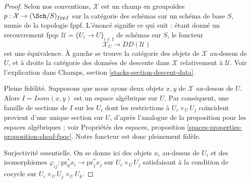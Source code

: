 \begin{proof}
Selon nos conventions, $\mathcal{X}$ est un champ
en groupoïdes $p : \mathcal{X} \to (\Sch/S)_{fppf}$
sur la catégorie des schémas sur un schéma de base $S$, munie
de la topologie fppf. L'énoncé signifie ce qui suit :
étant donné un recouvrement fpqc $\mathcal{U} = \{U_i \to U\}_{i \in I}$
de schémas sur $S$, le foncteur
$$
\mathcal{X}_U \longrightarrow DD(\mathcal{U})
$$
est une équivalence. À gauche se trouve la catégorie
des objets de $\mathcal{X}$ au-dessus de $U$, et à droite
la catégorie des données de descente dans $\mathcal{X}$ relativement à $\mathcal{U}$.
Voir l'explication dans Champs, section \ref{stacks-section-descent-data}.

\medskip\noindent
Pleine fidélité. Supposons que nous ayons deux objets $x, y$ de $\mathcal{X}$
au-dessus de $U$. Alors $I = \mathit{Isom}(x, y)$ est un espace algébrique sur $U$.
Par conséquent, une famille de sections de $I$ sur les $U_i$ dont les restrictions
à $U_i \times_U U_j$ coïncident provient d'une unique section sur $U$, d'après
l'analogue de la proposition pour les espaces algébriques ; voir
Propriétés des espaces, proposition
\ref{spaces-properties-proposition-sheaf-fpqc}.
Notre foncteur est donc pleinement fidèle.

\medskip\noindent
Surjectivité essentielle. On se donne ici des objets
$x_i$ au-dessus de $U_i$ et des isomorphismes
$\varphi_{ij} : \text{pr}_0^*x_i \to \text{pr}_1^*x_j$
sur $U_i \times_U U_j$ satisfaisant à la condition de cocycle
sur $U_i \times_U U_j \times_U U_k$.


\end{proof}
